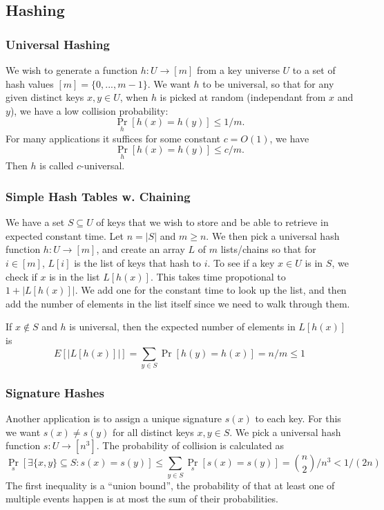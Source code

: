 \subsection{Hashing}

\subsubsection{Universal Hashing}
We wish to generate a function $h : U \rightarrow [m]$ from a key universe $U$
to a set of hash values $[m] = \{ 0, ..., m-1 \}$.  We want $h$ to be universal,
so that for any given distinct keys $x,y \in U$, when $h$ is picked at random
(independant from $x$ and $y$), we have a low collision probability:
\[
  \underset{h}{\Pr}[h(x) = h(y)] \leq 1/m.
\]
For many applications it suffices for some constant $c = O(1)$, we have
\[
  \underset{h}{\Pr}[h(x) = h(y)] \leq c/m.
\]
Then $h$ is called $c$-universal.

\subsubsection{Simple Hash Tables w. Chaining}
We have a set $S \subseteq U$ of keys that we wish to store and be able to
retrieve in expected constant time.  Let $n = |S|$ and $m \geq n$. We then pick
a universal hash function $h : U \rightarrow [m]$, and create an array $L$ of
$m$ lists/chains so that for $i\in[m]$, $L[i]$ is the list of keys that hash to
$i$.  To see if a key $x\in U$ is in $S$, we check if $x$ is in the list
$L[h(x)]$. This takes time propotional to $1+|L[h(x)]|$.  We add one for the
constant time to look up the list, and then add the number of elements in the
list itself since we need to walk through them.

If $x \notin S$ and $h$ is universal, then the expected number of elements in
$L[h(x)]$ is
\[
  E[|L[h(x)]|] = \sum_{y \in S} \Pr[h(y) = h(x)] = n/m \leq 1
\]

\subsubsection{Signature Hashes}
Another application is to assign a unique signature $s(x)$ to each key. For this
we want $s(x) \neq s(y)$ for all distinct keys $x,y \in S$.  We pick a universal
hash function $s: U \rightarrow [n^3]$. The probability of collision is
calculated as
\[
  \underset{s}{\Pr}[\exists\{x,y\}\subseteq S : s(x) = s(y)] \leq \sum_{y\in S}
  \underset{s}{\Pr}[s(x) = s(y)] = \binom{n}{2}/n^3 < 1/(2n)
\]
The first inequality is a ``union bound'', the probability of that at least one
of multiple events happen is at most the sum of their probabilities.

